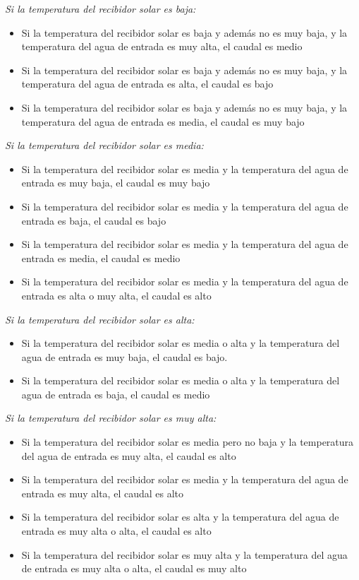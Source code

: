 			\textit{Si la temperatura del recibidor solar es baja:}\par
			\begin{itemize}
				\item Si la temperatura del recibidor solar es baja y además no es muy baja, y la temperatura del agua de entrada es muy alta, el caudal es medio
				\item Si la temperatura del recibidor solar es baja y además no es muy baja, y la temperatura del agua de entrada es alta, el caudal es bajo
				\item Si la temperatura del recibidor solar es baja y además no es muy baja, y la temperatura del agua de entrada es media, el caudal es muy bajo
			\end{itemize}
			
			\textit{Si la temperatura del recibidor solar es media:}\par
			\begin{itemize}
				\item Si la temperatura del recibidor solar es media y la temperatura del agua de entrada es muy baja, el caudal es muy bajo
				\item Si la temperatura del recibidor solar es media y la temperatura del agua de entrada es baja, el caudal es bajo
				\item Si la temperatura del recibidor solar es media y la temperatura del agua de entrada es media, el caudal es medio
				\item Si la temperatura del recibidor solar es media y la temperatura del agua de entrada es alta o muy alta, el caudal es alto
			\end{itemize}
			
			\textit{Si la temperatura del recibidor solar es alta:}\par
			\begin{itemize}
				\item Si la temperatura del recibidor solar es media o alta y la temperatura del agua de entrada es muy baja, el caudal es bajo.
				\item Si la temperatura del recibidor solar es media o alta y la temperatura del agua de entrada es baja, el caudal es medio
			\end{itemize}
			
			\textit{Si la temperatura del recibidor solar es muy alta:}\par
			\begin{itemize}
				\item Si la temperatura del recibidor solar es media pero no baja y la temperatura del agua de entrada es muy alta, el caudal es alto
				\item Si la temperatura del recibidor solar es media y la temperatura del agua de entrada es muy alta, el caudal es alto
				\item Si la temperatura del recibidor solar es alta y la temperatura del agua de entrada es muy alta o alta, el caudal es alto
				\item Si la temperatura del recibidor solar es muy alta y la temperatura del agua de entrada es muy alta o alta, el caudal es muy alto
			\end{itemize}
			
